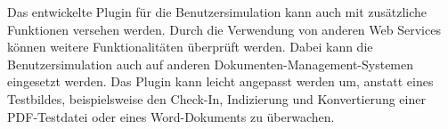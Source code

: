 Das entwickelte Plugin für die Benutzersimulation kann auch mit zusätzliche Funktionen versehen werden.
Durch die Verwendung von anderen Web Services können weitere Funktionalitäten überprüft werden.
Dabei kann die Benutzersimulation auch auf anderen Dokumenten-Management-Systemen eingesetzt werden.
Das Plugin kann leicht angepasst werden um, anstatt eines Testbildes, beispielsweise den Check-In, Indizierung und Konvertierung einer \gls{PDF}-Testdatei oder eines Word-Dokuments zu überwachen.


%
%
%
%
